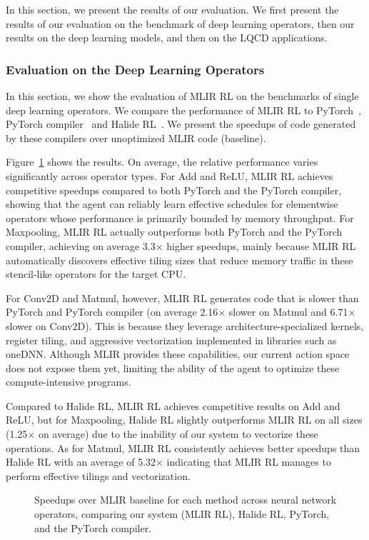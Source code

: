 \documentclass[10pt,twocolumn]{article}
\begin{document}
In this section, we present the results of our evaluation. We first present the results of our evaluation on the benchmark of deep learning operators, then our results on the deep learning models, and then on the LQCD applications.

\subsubsection{Evaluation on the Deep Learning Operators}
In this section, we show the evaluation of MLIR RL on the benchmarks of single deep learning operators. We compare the performance of MLIR RL to PyTorch~\cite{ref14}, PyTorch compiler~\cite{ref15} and Halide RL~\cite{ref6}. We present the speedups of code generated by these compilers over unoptimized MLIR code (baseline).

Figure~\ref{fig:opspeedups} shows the results. On average, the relative performance varies significantly across operator types. For Add and ReLU, MLIR RL achieves competitive speedups compared to both PyTorch and the PyTorch compiler, showing that the agent can reliably learn effective schedules for elementwise operators whose performance is primarily bounded by memory throughput. For Maxpooling, MLIR RL actually outperforms both PyTorch and the PyTorch compiler, achieving on average 3.3$\times$ higher speedups, mainly because MLIR RL automatically discovers effective tiling sizes that reduce memory traffic in these stencil-like operators for the target CPU.

For Conv2D and Matmul, however, MLIR RL generates code that is slower than PyTorch and PyTorch compiler (on average 2.16$\times$ slower on Matmul and 6.71$\times$ slower on Conv2D). This is because they leverage architecture-specialized kernels, register tiling, and aggressive vectorization implemented in libraries such as oneDNN. Although MLIR provides these capabilities, our current action space does not expose them yet, limiting the ability of the agent to optimize these compute-intensive programs.

Compared to Halide RL, MLIR RL achieves competitive results on Add and ReLU, but for Maxpooling, Halide RL slightly outperforms MLIR RL on all sizes (1.25$\times$ on average) due to the inability of our system to vectorize these operations. As for Matmul, MLIR RL consistently achieves better speedups than Halide RL with an average of 5.32$\times$ indicating that MLIR RL manages to perform effective tilings and vectorization.

\begin{figure}[t]
\centering
{}
\caption{Speedups over MLIR baseline for each method across neural network operators, comparing our system (MLIR RL), Halide RL, PyTorch, and the PyTorch compiler.}
\label{fig:opspeedups}
\end{figure}
\end{document}
